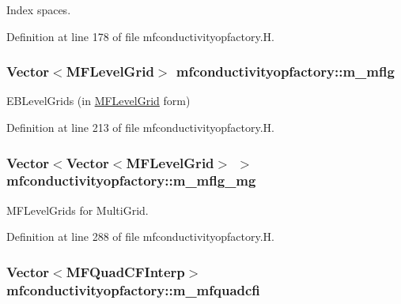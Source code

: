 Index spaces. 



Definition at line 178 of file mfconductivityopfactory.\+H.

\subsubsection[{\texorpdfstring{m\+\_\+mflg}{m_mflg}}]{\setlength{\rightskip}{0pt plus 5cm}Vector$<${\bf M\+F\+Level\+Grid}$>$ mfconductivityopfactory\+::m\+\_\+mflg\hspace{0.3cm}{\ttfamily [protected]}}\hypertarget{classmfconductivityopfactory_a8d1b2ca5d33ce5b26aee1fc000b66f17}{}\label{classmfconductivityopfactory_a8d1b2ca5d33ce5b26aee1fc000b66f17}


E\+B\+Level\+Grids (in \hyperlink{classMFLevelGrid}{M\+F\+Level\+Grid} form) 



Definition at line 213 of file mfconductivityopfactory.\+H.

\subsubsection[{\texorpdfstring{m\+\_\+mflg\+\_\+mg}{m_mflg_mg}}]{\setlength{\rightskip}{0pt plus 5cm}Vector$<$Vector$<${\bf M\+F\+Level\+Grid}$>$ $>$ mfconductivityopfactory\+::m\+\_\+mflg\+\_\+mg\hspace{0.3cm}{\ttfamily [protected]}}\hypertarget{classmfconductivityopfactory_ad9401618c67c2706dc9c564ba608cc27}{}\label{classmfconductivityopfactory_ad9401618c67c2706dc9c564ba608cc27}


M\+F\+Level\+Grids for Multi\+Grid. 



Definition at line 288 of file mfconductivityopfactory.\+H.

\subsubsection[{\texorpdfstring{m\+\_\+mfquadcfi}{m_mfquadcfi}}]{\setlength{\rightskip}{0pt plus 5cm}Vector$<${\bf M\+F\+Quad\+C\+F\+Interp}$>$ mfconductivityopfactory\+::m\+\_\+mfquadcfi\hspace{0.3cm}{\ttfamily [protected]}}\hypertarget{classmfconductivityopfactory_a9b374566612b8904f2f94e2a8e439229}{}\label{classmfconductivityopfactory_a9b374566612b8904f2f94e2a8e439229}


